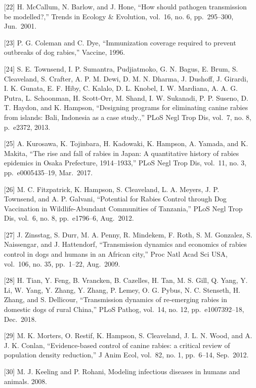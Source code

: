 \documentclass[
]{book}
\begin{document}
{[}22{]} H. McCallum, N. Barlow, and J. Hone, ``How should pathogen transmission be modelled?,'' Trends in Ecology \& Evolution, vol.~16, no. 6, pp.~295--300, Jun.~2001.

{[}23{]} P. G. Coleman and C. Dye, ``Immunization coverage required to prevent outbreaks of dog rabies,'' Vaccine, 1996.

{[}24{]} S. E. Townsend, I. P. Sumantra, Pudjiatmoko, G. N. Bagus, E. Brum, S. Cleaveland, S. Crafter, A. P. M. Dewi, D. M. N. Dharma, J. Dushoff, J. Girardi, I. K. Gunata, E. F. Hiby, C. Kalalo, D. L. Knobel, I. W. Mardiana, A. A. G. Putra, L. Schoonman, H. Scott-Orr, M. Shand, I. W. Sukanadi, P. P. Suseno, D. T. Haydon, and K. Hampson, ``Designing programs for eliminating canine rabies from islands: Bali, Indonesia as a case study.,'' PLoS Negl Trop Dis, vol.~7, no. 8, p.~e2372, 2013.

{[}25{]} A. Kurosawa, K. Tojinbara, H. Kadowaki, K. Hampson, A. Yamada, and K. Makita, ``The rise and fall of rabies in Japan: A quantitative history of rabies epidemics in Osaka Prefecture, 1914--1933,'' PLoS Negl Trop Dis, vol.~11, no. 3, pp.~e0005435--19, Mar.~2017.

{[}26{]} M. C. Fitzpatrick, K. Hampson, S. Cleaveland, L. A. Meyers, J. P. Townsend, and A. P. Galvani, ``Potential for Rabies Control through Dog Vaccination in Wildlife-Abundant Communities of Tanzania,'' PLoS Negl Trop Dis, vol.~6, no. 8, pp.~e1796--6, Aug.~2012.

{[}27{]} J. Zinsstag, S. Durr, M. A. Penny, R. Mindekem, F. Roth, S. M. Gonzalez, S. Naissengar, and J. Hattendorf, ``Transmission dynamics and economics of rabies control in dogs and humans in an African city,'' Proc Natl Acad Sci USA, vol.~106, no. 35, pp.~1--22, Aug.~2009.

{[}28{]} H. Tian, Y. Feng, B. Vrancken, B. Cazelles, H. Tan, M. S. Gill, Q. Yang, Y. Li, W. Yang, Y. Zhang, Y. Zhang, P. Lemey, O. G. Pybus, N. C. Stenseth, H. Zhang, and S. Dellicour, ``Transmission dynamics of re-emerging rabies in domestic dogs of rural China,'' PLoS Pathog, vol.~14, no. 12, pp.~e1007392--18, Dec.~2018.

{[}29{]} M. K. Morters, O. Restif, K. Hampson, S. Cleaveland, J. L. N. Wood, and A. J. K. Conlan, ``Evidence-based control of canine rabies: a critical review of population density reduction,'' J Anim Ecol, vol.~82, no. 1, pp.~6--14, Sep.~2012.

{[}30{]} M. J. Keeling and P. Rohani, Modeling infectious diseases in humans and animals. 2008.
\end{document}
